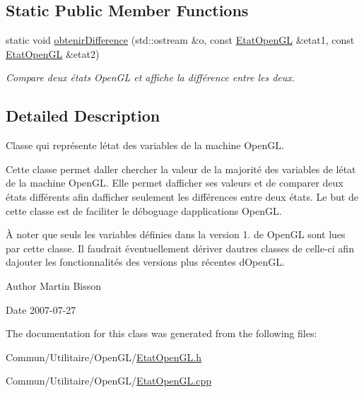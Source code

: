 \subsection*{Static Public Member Functions}
\begin{DoxyCompactItemize}
\item 
static void \hyperlink{group__utilitaire_ga24ddfdab3e65cc4069b86ba84d3f565b}{obtenir\+Difference} (std\+::ostream \&o, const \hyperlink{class_etat_open_g_l}{Etat\+Open\+G\+L} \&etat1, const \hyperlink{class_etat_open_g_l}{Etat\+Open\+G\+L} \&etat2)
\begin{DoxyCompactList}\small\item\em Compare deux états Open\+G\+L et affiche la différence entre les deux. \end{DoxyCompactList}\end{DoxyCompactItemize}


\subsection{Detailed Description}
Classe qui représente l\textquotesingle{}état des variables de la machine Open\+G\+L. 

Cette classe permet d\textquotesingle{}aller chercher la valeur de la majorité des variables de l\textquotesingle{}état de la machine Open\+G\+L. Elle permet d\textquotesingle{}afficher ses valeurs et de comparer deux états différents afin d\textquotesingle{}afficher seulement les différences entre deux états. Le but de cette classe est de faciliter le déboguage d\textquotesingle{}applications Open\+G\+L.

À noter que seuls les variables définies dans la version 1. de Open\+G\+L sont lues par cette classe. Il faudrait éventuellement dériver d\textquotesingle{}autres classes de celle-\/ci afin d\textquotesingle{}ajouter les fonctionnalités des versions plus récentes d\textquotesingle{}Open\+G\+L.

\begin{DoxyAuthor}{Author}
Martin Bisson 
\end{DoxyAuthor}
\begin{DoxyDate}{Date}
2007-\/07-\/27 
\end{DoxyDate}


The documentation for this class was generated from the following files\+:\begin{DoxyCompactItemize}
\item 
Commun/\+Utilitaire/\+Open\+G\+L/\hyperlink{_etat_open_g_l_8h}{Etat\+Open\+G\+L.\+h}\item 
Commun/\+Utilitaire/\+Open\+G\+L/\hyperlink{_etat_open_g_l_8cpp}{Etat\+Open\+G\+L.\+cpp}\end{DoxyCompactItemize}
